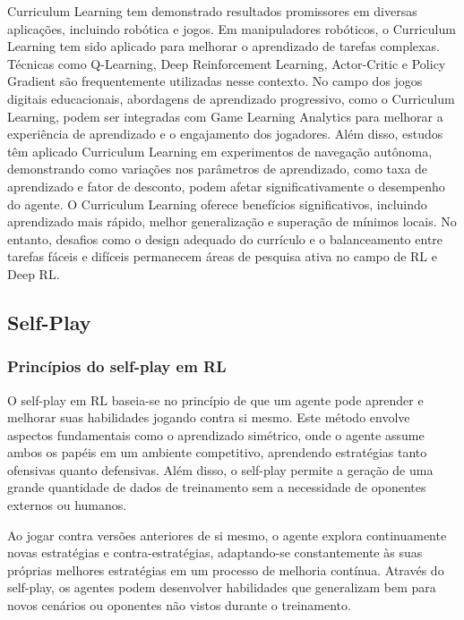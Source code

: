 Curriculum Learning tem demonstrado resultados promissores em diversas aplicações, incluindo robótica e jogos. Em manipuladores robóticos, o Curriculum Learning tem sido aplicado para melhorar o aprendizado de tarefas complexas. Técnicas como Q-Learning, Deep Reinforcement Learning, Actor-Critic e Policy Gradient são frequentemente utilizadas nesse contexto\cite{Brito2023AplicaesDA}. No campo dos jogos digitais educacionais, abordagens de aprendizado progressivo, como o Curriculum Learning, podem ser integradas com Game Learning Analytics para melhorar a experiência de aprendizado e o engajamento dos jogadores\cite{Geremias2024OUD}. Além disso, estudos têm aplicado Curriculum Learning em experimentos de navegação autônoma, demonstrando como variações nos parâmetros de aprendizado, como taxa de aprendizado e fator de desconto, podem afetar significativamente o desempenho do agente\cite{Sukhbaatar2018learninggoalembeddingsselfplay}. O Curriculum Learning oferece benefícios significativos, incluindo aprendizado mais rápido, melhor generalização e superação de mínimos locais. No entanto, desafios como o design adequado do currículo e o balanceamento entre tarefas fáceis e difíceis permanecem áreas de pesquisa ativa no campo de RL e Deep RL.

\subsection{Self-Play}
\label{subsec:self_play}

\subsubsection{Princípios do self-play em RL}
\label{subsubsec:self_play_principios}

O self-play em RL baseia-se no princípio de que um agente pode aprender e melhorar suas habilidades jogando contra si mesmo. Este método envolve aspectos fundamentais como o aprendizado simétrico, onde o agente assume ambos os papéis em um ambiente competitivo, aprendendo estratégias tanto ofensivas quanto defensivas\cite{Sukhbaatar2018learninggoalembeddingsselfplay}. Além disso, o self-play permite a geração de uma grande quantidade de dados de treinamento sem a necessidade de oponentes externos ou humanos\cite{Sukhbaatar2018learninggoalembeddingsselfplay}.

Ao jogar contra versões anteriores de si mesmo, o agente explora continuamente novas estratégias e contra-estratégias\cite{Sukhbaatar2018learninggoalembeddingsselfplay}, adaptando-se constantemente às suas próprias melhores estratégias em um processo de melhoria contínua\cite{Sukhbaatar2018learninggoalembeddingsselfplay}. Através do self-play, os agentes podem desenvolver habilidades que generalizam bem para novos cenários ou oponentes não vistos durante o treinamento\cite{Sukhbaatar2018learninggoalembeddingsselfplay}.

